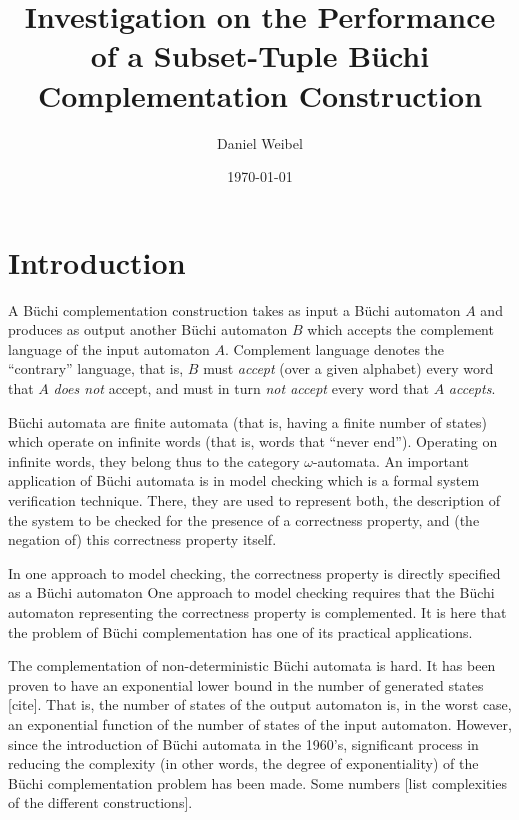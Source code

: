 \documentclass{scrreprt}
\newcommand{\om}{{$\omega$}}
\begin{document}
\title{Investigation on the Performance of a Subset-Tuple Büchi Complementation Construction}
\author{Daniel Weibel}
\date{\today}
\maketitle


\tableofcontents

\chapter{Introduction}

A Büchi complementation construction takes as input a Büchi automaton $A$ and produces as output another Büchi automaton $B$ which accepts the complement language of the input automaton $A$. Complement language denotes the ``contrary'' language, that is, $B$ must \emph{accept} (over a given alphabet) every word that $A$ \emph{does not} accept, and must in turn \emph{not accept} every word that $A$ \emph{accepts}.

Büchi automata are finite automata (that is, having a finite number of states) which operate on infinite words (that is, words that ``never end''). Operating on infinite words, they belong thus to the category \om-automata. An important application of Büchi automata is in model checking which is a formal system verification technique. There, they are used to represent both, the description of the system to be checked for the presence of a correctness property, and (the negation of) this correctness property itself.

In one approach to model checking, the correctness property is directly specified as a Büchi automaton
One approach to model checking requires that the Büchi automaton representing the correctness property is complemented. It is here that the problem of Büchi complementation has one of its practical applications. 

The complementation of non-deterministic Büchi automata is hard. It has been proven to have an exponential lower bound in the number of generated states [cite]. That is, the number of states of the output automaton is, in the worst case, an exponential function of the number of states of the input automaton. However, since the introduction of Büchi automata in the 1960's, significant process in reducing the complexity (in other words, the degree of exponentiality) of the Büchi complementation problem has been made. Some numbers [list complexities of the different constructions].
\end{document}

